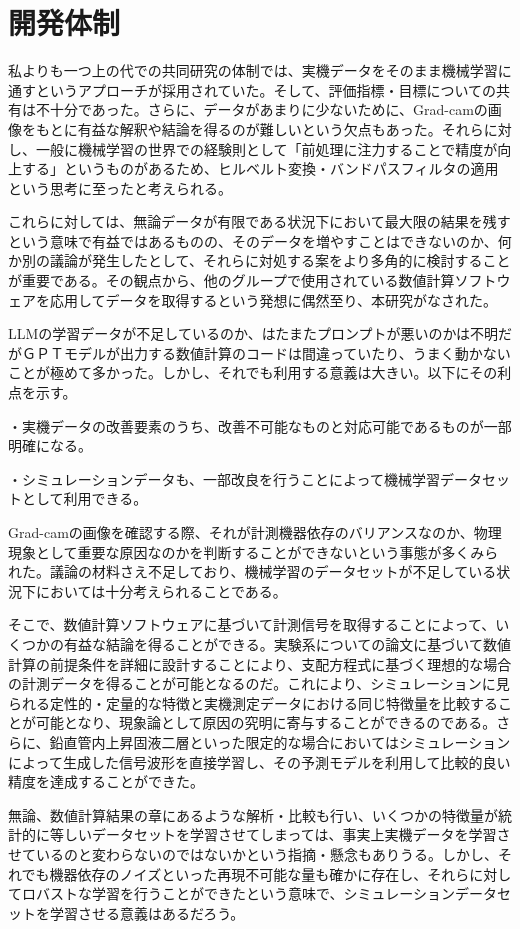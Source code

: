 \documentclass[uplatex]{suribt}
\begin{document}
\section{開発体制}
私よりも一つ上の代での共同研究の体制では、実機データをそのまま機械学習に通すというアプローチが採用されていた。そして、評価指標・目標についての共有は不十分であった。さらに、データがあまりに少ないために、Grad-camの画像をもとに有益な解釈や結論を得るのが難しいという欠点もあった。それらに対し、一般に機械学習の世界での経験則として「前処理に注力することで精度が向上する」というものがあるため、ヒルベルト変換・バンドパスフィルタの適用という思考に至ったと考えられる。\par
これらに対しては、無論データが有限である状況下において最大限の結果を残すという意味で有益ではあるものの、そのデータを増やすことはできないのか、何か別の議論が発生したとして、それらに対処する案をより多角的に検討することが重要である。その観点から、他のグループで使用されている数値計算ソフトウェアを応用してデータを取得するという発想に偶然至り、本研究がなされた。\par
LLMの学習データが不足しているのか、はたまたプロンプトが悪いのかは不明だがＧＰＴモデルが出力する数値計算のコードは間違っていたり、うまく動かないことが極めて多かった。しかし、それでも利用する意義は大きい。以下にその利点を示す。\par
・実機データの改善要素のうち、改善不可能なものと対応可能であるものが一部明確になる。\par
・シミュレーションデータも、一部改良を行うことによって機械学習データセットとして利用できる。\par
Grad-camの画像を確認する際、それが計測機器依存のバリアンスなのか、物理現象として重要な原因なのかを判断することができないという事態が多くみられた。議論の材料さえ不足しており、機械学習のデータセットが不足している状況下においては十分考えられることである。\par
そこで、数値計算ソフトウェアに基づいて計測信号を取得することによって、いくつかの有益な結論を得ることができる。実験系についての論文に基づいて数値計算の前提条件を詳細に設計することにより、支配方程式に基づく理想的な場合の計測データを得ることが可能となるのだ。これにより、シミュレーションに見られる定性的・定量的な特徴と実機測定データにおける同じ特徴量を比較することが可能となり、現象論として原因の究明に寄与することができるのである。さらに、鉛直管内上昇固液二層といった限定的な場合においてはシミュレーションによって生成した信号波形を直接学習し、その予測モデルを利用して比較的良い精度を達成することができた。\par
無論、数値計算結果の章にあるような解析・比較も行い、いくつかの特徴量が統計的に等しいデータセットを学習させてしまっては、事実上実機データを学習させているのと変わらないのではないかという指摘・懸念もありうる。しかし、それでも機器依存のノイズといった再現不可能な量も確かに存在し、それらに対してロバストな学習を行うことができたという意味で、シミュレーションデータセットを学習させる意義はあるだろう。\par
\end{document}
